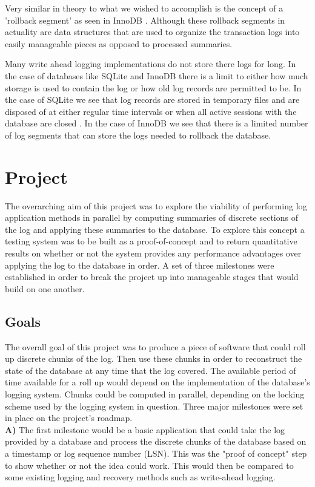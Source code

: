 \documentclass{article}
\begin{document}
Very similar in theory to what we wished to accomplish is the concept of a 'rollback segment' as seen in InnoDB \cite{InnoDBredo}. Although these rollback segments in actuality are data structures that are used to organize the transaction logs into easily manageable pieces as opposed to processed summaries.

Many write ahead logging implementations do not store there logs for long. In the case of databases like SQLite and InnoDB there is a limit to either how much storage is used to contain the log or how old log records are permitted to be. In the case of SQLite we see that log records are stored in temporary files and are disposed of at either regular time intervals or when all active sessions with the database are closed \cite{SQLiteLog}. In the case of InnoDB we see that there is a limited number of log segments that can store the logs needed to rollback the database\cite{InnoDBUndo}.


\section{Project}
The overarching aim of this project was to explore the viability of performing log application methods in parallel by computing summaries of discrete sections of the log and applying these summaries to the database. To explore this concept a testing system was to be built as a proof-of-concept and to return quantitative results on whether or not the system provides any performance advantages over applying the log to the database in order. A set of three milestones were established in order to break the project up into manageable stages that would build on one another. 

\subsection{Goals}
The overall goal of this project was to produce a piece of software that could roll up discrete chunks
of the log. Then use these chunks in order to reconstruct the state of the database at any time that
the log covered. The available period of time available for a roll up would depend on the implementation
of the database's logging system. Chunks could be computed in parallel, depending on the locking scheme
used by the logging system in question. Three major milestones were set in place on the project's roadmap.\\

\textbf{A)} The first milestone would be a basic application that could take the log provided by a database
and process the discrete chunks of the database based on a timestamp or log sequence number (LSN). This was 
the "proof of concept" step to show whether or not the idea could work. This would then be compared to some
existing logging and recovery methods such as write-ahead logging.\\
\end{document}
